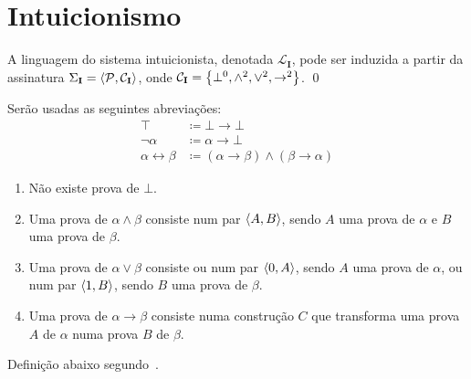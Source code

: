 \section{Intuicionismo}
    \begin{definition}
        A linguagem do sistema intuicionista, denotada $\mathcal{L}_\mathbf{I}$, pode ser induzida a partir da assinatura $\Sigma_\mathbf{I}=\langle\mathcal{P},\mathcal{C}_\mathbf{I}\rangle$, onde $\mathcal{C}_\mathbf{I}=\left\{\bot^0,\wedge^2,\vee^2,\to^2\right\}$.
        \qed{}
    \end{definition}

    \begin{notation}
        Serão usadas as seguintes abreviações:
        \begin{align*}
            \top&\coloneqq\bot\to\bot\\
            \neg\alpha&\coloneqq\alpha\to\bot\\
            \alpha\leftrightarrow\beta&\coloneqq(\alpha\to\beta)\wedge(\beta\to\alpha)
        \end{align*}
    \end{notation}

    \begin{enumerate}[label=\textbf{(\alph*)}, left=\parindent]
        \item Não existe prova de $\bot$.
        \item Uma prova de $\alpha\wedge\beta$ consiste num par $\langle A,B\rangle$, sendo $A$ uma prova de $\alpha$ e $B$ uma prova de $\beta$.
        \item Uma prova de $\alpha\vee\beta$ consiste ou num par $\langle0,A\rangle$, sendo $A$ uma prova de $\alpha$, ou num par $\langle1,B\rangle$, sendo $B$ uma prova de $\beta$.
        \item Uma prova de $\alpha\to\beta$ consiste numa construção $C$ que transforma uma prova $A$ de $\alpha$ numa prova $B$ de $\beta$.
    \end{enumerate}

    Definição abaixo segundo~\cite{Troelstra}.

